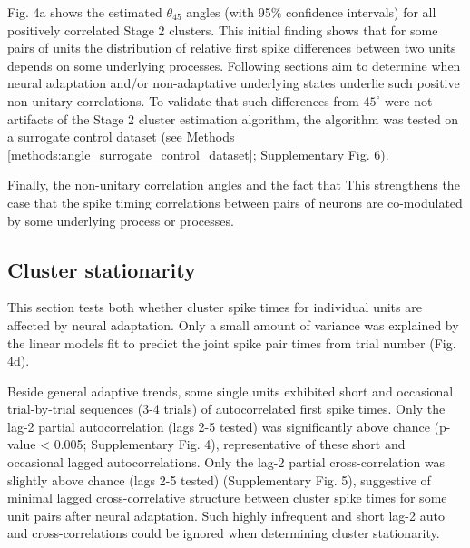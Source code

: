 \documentclass{article}
\begin{document}
Fig. 4a shows the estimated $\theta_{45}$ angles (with 95\% confidence intervals) for all positively correlated Stage 2 clusters.
This initial finding shows that for some pairs of units the distribution of relative first spike differences between two units depends on some underlying processes.
Following sections aim to determine when neural adaptation and/or non-adaptative underlying states underlie such positive non-unitary correlations. 
To validate that such differences from $45^{\circ}$ were not artifacts of the Stage 2 cluster estimation algorithm, the algorithm was tested on a surrogate control dataset (see Methods \ref{methods:angle_surrogate_control_dataset}; Supplementary Fig. 6). 

Finally, the non-unitary correlation angles and the fact that
This strengthens the case that the spike timing correlations between pairs of neurons are co-modulated by some underlying process or processes. 




\subsection*{Cluster stationarity}

This section tests both whether cluster spike times for individual units are affected by neural adaptation. 
Only a small amount of variance was explained by the linear models fit to predict the joint spike pair times from trial number (Fig. 4d). 

Beside general adaptive trends, some single units exhibited short and occasional trial-by-trial sequences (3-4 trials) of autocorrelated first spike times.
Only the lag-2 partial autocorrelation (lags 2-5 tested) was significantly above chance (p-value < 0.005; Supplementary Fig. 4), representative of these short and occasional lagged autocorrelations. Only the lag-2 partial cross-correlation was slightly above chance (lags 2-5 tested) (Supplementary Fig. 5), suggestive of minimal lagged cross-correlative structure between cluster spike times for some unit pairs after neural adaptation. Such highly infrequent and short lag-2 auto and cross-correlations could be ignored when determining cluster stationarity.
\end{document}
